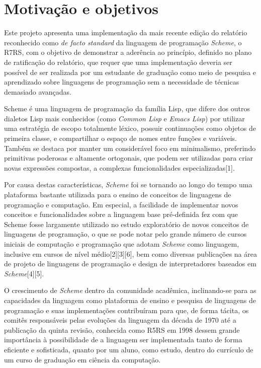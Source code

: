 \section{Motivação e objetivos}
\label{sec:motivacao}

Este projeto apresenta uma implementação da mais recente edição do relatório
reconhecido como \textit{de facto standard} da linguagem de programação
\textit{Scheme}, o \acs{R7RS}, com o objetivo de demonstrar a aderência ao
princípio, definido no plano de ratificação do relatório, que requer que uma
implementação deveria ser possível de ser realizada por um estudante de
graduação como meio de pesquisa e aprendizado sobre linguagens de programação
sem a necessidade de técnicas demasiado avançadas.

Scheme é uma linguagem de programação da família Lisp, que difere dos outros
dialetos Lisp  mais conhecidos (como \textit{Common Lisp} e \textit{Emacs
Lisp}) por utilizar uma estratégia de escopo totalmente léxico, possuir
continuações como objetos de primeira classe, e compartilhar o espaço de nomes
entre funções e variáveis. Também se destaca por manter um considerável foco em
minimalismo, preferindo primitivas poderosas e altamente ortogonais, que podem
ser utilizadas para criar novas expressões compostas, a complexas
funcionalidades especializadas[1].

Por causa destas características, \textit{Scheme} foi se tornando ao longo do tempo uma
plataforma bastante utilizada para o ensino de conceitos de linguagens de
programação e computação. Em especial, a facilidade de implementar novos
conceitos e funcionalidades sobre a linguagem base pré-definida fez com que
Scheme fosse largamente utilizado no estudo exploratório de novos conceitos de
linguagens de programação, o que se pode notar pelo grande número de cursos
iniciais de computação e programação que adotam \textit{Scheme} como linguagem,
inclusive em cursos de nível médio[2][3][6], bem como diversas publicações na
área de projeto de linguagens de programação e design de interpretadores
baseados em \textit{Scheme}[4][5].

O crescimento de \textit{Scheme} dentro da comunidade acadêmica, inclinando-se
para as capacidades da linguagem como plataforma de ensino e pesquisa de
linguagens de programação e suas implementações contribuíram para que, de forma
tácita, os comitês responsáveis pelas evoluções da linguagem da década de 1970
até a publicação da quinta revisão, conhecida como \acs{R5RS} em 1998 dessem
grande importância à possibilidade de a linguagem ser implementada tanto de
forma eficiente e sofisticada, quanto por um aluno, como estudo, dentro do
currículo de um curso de graduação em ciência da computação.

